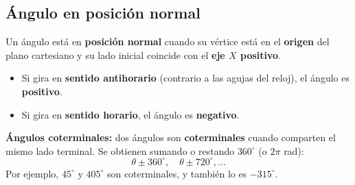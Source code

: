 \documentclass[12pt, letterpaper]{article}
\begin{document}
\subsection{Ángulo en posición normal}

\begin{cuadroteoria}
  Un ángulo está en \textbf{posición normal} cuando su vértice está en el \textbf{origen} del plano cartesiano y su lado inicial coincide con el \textbf{eje $X$ positivo}.
  \begin{center}
  \end{center}
  \begin{itemize}[leftmargin=*]
    \item Si gira en \textbf{sentido antihorario} (contrario a las agujas del reloj), el ángulo es \textbf{positivo}.
    \item Si gira en \textbf{sentido horario}, el ángulo es \textbf{negativo}.
  \end{itemize}
\end{cuadroteoria}

\begin{cuadroteoria}
  \textbf{Ángulos coterminales:} dos ángulos son \textbf{coterminales} cuando comparten el mismo lado terminal. Se obtienen sumando o restando $360^{\circ}$ (o $2\pi$ rad):
  $$\theta \pm 360^{\circ}, \quad \theta \pm 720^{\circ}, \ldots$$
  Por ejemplo, $45^{\circ}$ y $405^{\circ}$ son coterminales, y también lo es $-315^{\circ}$.
\end{cuadroteoria}
\end{document}
